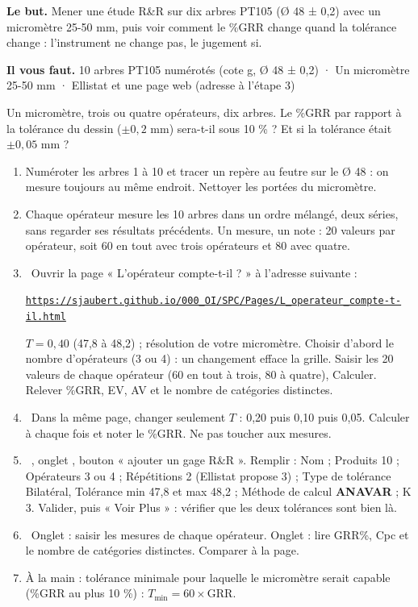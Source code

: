 \documentclass[10pt,a4paper]{article}
\begin{document}
\thispagestyle{fancy}
\begin{tcolorbox}[boite]\textbf{Le but.} Mener une étude R\&R sur dix arbres PT105 (Ø 48 ± 0,2) avec un micromètre 25-50 mm, puis voir comment le \%GRR change quand la tolérance change : l'instrument ne change pas, le jugement si.\par\textbf{Il vous faut.} 10 arbres PT105 numérotés (cote g, Ø 48 ± 0,2) · Un micromètre 25-50 mm · Ellistat et une page web (adresse à l'étape 3)\end{tcolorbox}
\begin{tcolorbox}[pred]Un micromètre, trois ou quatre opérateurs, dix arbres. Le \%GRR par rapport à la tolérance du dessin ($\pm 0{,}2$ mm) sera-t-il sous 10 \% ? Et si la tolérance était $\pm 0{,}05$ mm ?\reponse\end{tcolorbox}
\begin{enumerate}[label=\textcolor{cyan}{\textbf{\arabic*.}},leftmargin=15pt,itemsep=1.5pt]
\item Numéroter les arbres 1 à 10 et tracer un repère au feutre sur le Ø 48 : on mesure toujours au même endroit. Nettoyer les portées du micromètre.
\item Chaque opérateur mesure les 10 arbres dans un ordre mélangé, deux séries, sans regarder ses résultats précédents. Un mesure, un note : 20 valeurs par opérateur, soit 60 en tout avec trois opérateurs et 80 avec quatre.
\item \tagW\ Ouvrir la page « L'opérateur compte-t-il ? » à l'adresse suivante :\par \href{https://sjaubert.github.io/000_OI/SPC/Pages/L_operateur_compte-t-il.html}{\nolinkurl{https://sjaubert.github.io/000_OI/SPC/Pages/L_operateur_compte-t-il.html}}\par $T = 0{,}40$ (47,8 à 48,2) ; résolution de votre micromètre. Choisir d'abord le nombre d'opérateurs (3 ou 4) : un changement efface la grille. Saisir les 20 valeurs de chaque opérateur (60 en tout à trois, 80 à quatre), Calculer. Relever \%GRR, EV, AV et le nombre de catégories distinctes.
\item \tagW\ Dans la même page, changer seulement $T$ : 0,20 puis 0,10 puis 0,05. Calculer à chaque fois et noter le \%GRR. Ne pas toucher aux mesures.
\item \tagE\ , onglet , bouton « ajouter un gage R\&R ». Remplir : Nom ; Produits 10 ; Opérateurs 3 ou 4 ; Répétitions 2 (Ellistat propose 3) ; Type de tolérance Bilatéral, Tolérance min 47,8 et max 48,2 ; Méthode de calcul \textbf{ANAVAR} ; K 3. Valider, puis « Voir Plus » : vérifier que les deux tolérances sont bien là.
\item \tagE\ Onglet  : saisir les mesures de chaque opérateur. Onglet  : lire GRR\%, Cpc et le nombre de catégories distinctes. Comparer à la page.
\item À la main : tolérance minimale pour laquelle le micromètre serait capable (\%GRR au plus 10 \%) : $T_{\min} = 60 \times \text{GRR}$.
\end{enumerate}
\end{document}

